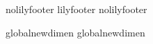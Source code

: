 \def\EndLilyPondOutput{
  \ifundefined{lilypondpaperlastpagefill}
    \vskip 0pt plus \lilypondpaperinterscorelinefill00 fill
  \fi
  \csname bye\endcsname
}


\ifx\csname nolilyfooter\endcsname\relax
  \csname lilyfooter\texsuffix\endcsname
\else
  \csname nolilyfooter\texsuffix\endcsname
\fi

\ifx\outputscale\undefined
  \csname global\endcsname\csname newdimen\endcsname\outputscale
  \csname global\endcsname\csname newdimen\endcsname\scoreshift
\fi

\endlinechar \lilyponddefsELC
\endinput
